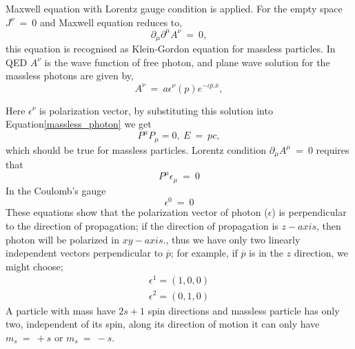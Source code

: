 Maxwell equation with Lorentz gauge condition is applied. For the empty space  $J^{\nu}~=~0$ and Maxwell equation reduces to,
\begin{equation}\label{massless_photon}
\partial_{\mu}\partial^{\mu}A^{\nu}~=~0,
\end{equation}
this equation is recognised as Klein-Gordon equation for massless particles. In QED $A^{\nu}$ is the wave function of free photon, and plane wave solution for the massless photons are given by,
\begin{equation}
A^{\nu}~=~a\epsilon^{\nu}(p) e^{-\iota\overline{p}.\overline{x}},
\end{equation}

Here $\epsilon^{\nu}$ is polarization vector, by substituting this solution into Equation\ref{massless_photon} we get 
\begin{equation}
P^{\mu}P_{\mu}=0,~E~=~pc,
\end{equation}
which should be true for massless particles.
Lorentz condition $\partial_{\mu}A^{\mu}~=~0$ requires that 
\begin{equation}
P^{\mu}\epsilon_{\mu}~=~0
\end{equation}
In the Coulomb's gauge 
\begin{equation}
\epsilon^{0}~=~0
\end{equation}
These equations show that the polarization vector of photon ($\epsilon$) is perpendicular to the direction of propagation; if the direction of propagation is $z-axis$, then photon will be polarized in $xy-axis.$, thus we have only two linearly independent vectors perpendicular to $\overline{p}$; for example, if $\overline{p}$ is in the $z$ direction, we might choose;
\begin{eqnarray}
\epsilon^{1}=(1,0,0)\\
\epsilon^{2}=(0,1,0)
\end{eqnarray}
A particle with mass have $2s+1$ spin directions and massless particle has only two, independent of its spin, along its direction of motion it can only have $m_{s}~=~+s   $  or $m_{s}~=~-s$.

